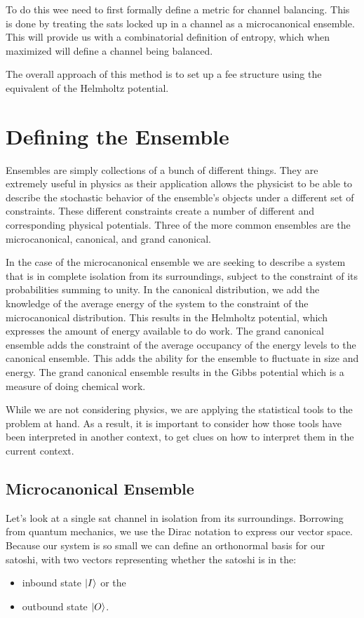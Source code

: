 \documentclass[review,12pt]{elsarticle}
\begin{document}
To do this wee need to first formally define a metric for channel balancing.
This is done by treating the sats locked up in a channel as a microcanonical ensemble.
This will provide us with a combinatorial definition of entropy, which when maximized will define a channel being balanced.

The overall approach of this method is to set up a fee structure using the equivalent of the Helmholtz potential.

\section{Defining the Ensemble}
Ensembles are simply collections of a bunch of different things.
They are extremely useful in physics as their application allows the physicist to be able to describe the stochastic behavior of the ensemble's objects under a different set of constraints.
These different constraints create a number of different and corresponding physical potentials.
Three of the more common ensembles are the microcanonical, canonical, and grand canonical.

In the case of the microcanonical ensemble we are seeking to describe a system that is in complete isolation from its surroundings, subject to the constraint of its probabilities summing to unity.
In the canonical distribution, we add the knowledge of the average energy of the system to the constraint of the microcanonical distribution.
This results in the Helmholtz potential, which expresses the amount of energy available to do work.
The grand canonical ensemble adds the constraint of the average occupancy of the energy levels to the canonical ensemble.
This adds the ability for the ensemble to fluctuate in size and energy.
The grand canonical ensemble results in the Gibbs potential which is a measure of doing chemical work.

While we are not considering physics, we are applying the statistical tools to the problem at hand.
As a result, it is important to consider how those tools have been interpreted in another context, to get clues on how to interpret them in the current context.

\subsection{Microcanonical Ensemble}
Let's look at a single sat channel in isolation from its surroundings.
Borrowing from quantum mechanics, we use the Dirac notation to express our vector space.
Because our system is so small we can define an orthonormal basis for our satoshi, with two vectors representing whether the satoshi is in the:
\begin{itemize}
  \item inbound state $\Ket{I}$ or the
  \item outbound state $\Ket{O}$.
\end{itemize}
\end{document}
